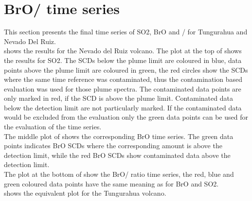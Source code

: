 \documentclass  [
  paper    = a4,
  BCOR     = 10mm,
  twoside,
  fontsize = 12pt,
  fleqn,
  toc      = bibnumbered,
  toc      = listofnumbered,
  numbers  = noendperiod,
  headings = normal,
  listof   = leveldown,
  version  = 3.03
]                                       {scrreprt}
\begin{document}
\section{BrO/  time series}
This section presents the final time series of SO2, BrO and /  for Tungurahua and Nevado Del Ruiz.\\
 shows the results for the Nevado del Ruiz volcano. The plot at the top of  shows the results for SO2. The  SCDs below the plume limit are coloured in blue, data points above the plume limit are coloured in green, the red circles show the  SCDs where the same time reference was contaminated, thus the contamination based evaluation was used for those plume spectra. The contaminated data points are only marked in red, if the  SCD is above the plume limit. Contaminated data below the detection limit are not particularly 
marked. If the contaminated data would be excluded from the evaluation only the green data points can be used for the evaluation of the time series.\\ 
The middle plot of  shows the corresponding BrO time series. The green data points indicates BrO SCDs where the corresponding  amount is above the detection limit, while the red BrO SCDs show contaminated data above the detection limit.\\
The plot at the bottom of  show the BrO/ ratio time series, the red, blue and green coloured data points have the same meaning as for BrO and SO2.\\
 shows the equivalent plot for the Tungurahua volcano.\\
\end{document}

